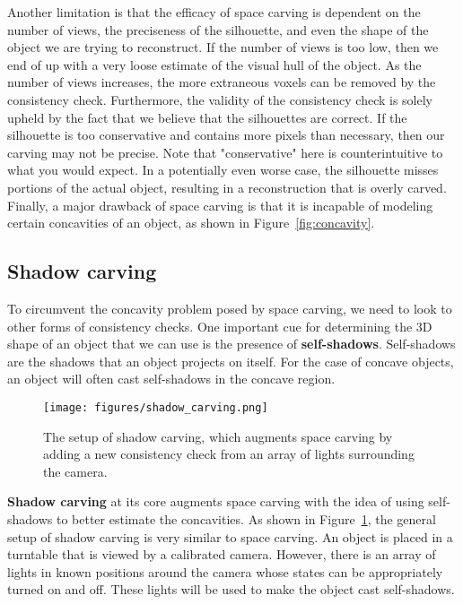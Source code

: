\documentclass[a4paper, 12pt]{article}
\renewcommand\emph{\textbf}
\numberwithin{equation}{section}
\begin{document}
Another limitation is that the efficacy of space carving is dependent on the number of views, the preciseness of the silhouette, and even the shape of the object we are trying to reconstruct. If the number of views is too low, then we end of up with a very loose estimate of the visual hull of the object. As the number of views increases, the more extraneous voxels can be removed by the consistency check. Furthermore, the validity of the consistency check is solely upheld by the fact that we believe that the silhouettes are correct. If the silhouette is too conservative and contains more pixels than necessary, then our carving may not be precise. Note that "conservative" here is counterintuitive to what you would expect. In a potentially even worse case, the silhouette misses portions of the actual object, resulting in a reconstruction that is overly carved. Finally, a major drawback of space carving is that it is incapable of modeling certain concavities of an object, as shown in Figure~\ref{fig:concavity}.

\subsection{Shadow carving}
To circumvent the concavity problem posed by space carving, we need to look to other forms of consistency checks. One important cue for determining the 3D shape of an object that we can use is the presence of \emph{self-shadows}. Self-shadows are the shadows that an object projects on itself. For the case of concave objects, an object will often cast self-shadows in the concave region. 

\begin{figure}[h!]
    \centering
    \texttt{[image: figures/shadow\_carving.png]}
    \caption{The setup of shadow carving, which augments space carving by adding a new consistency check from an array of lights surrounding the camera.}
    \label{fig:shadow_carving}
\end{figure}

\emph{Shadow carving} at its core augments space carving with the idea of using self-shadows to better estimate the concavities. As shown in Figure~\ref{fig:shadow_carving}, the general setup of shadow carving is very similar to space carving. An object is placed in a turntable that is viewed by a calibrated camera. However, there is an array of lights in known positions around the camera whose states can be appropriately turned on and off. These lights will be used to make the object cast self-shadows.
\end{document}
